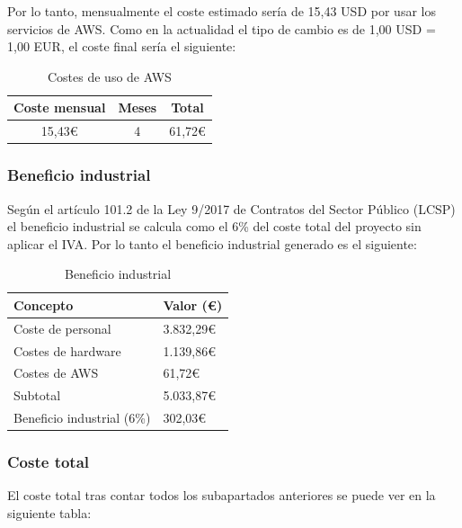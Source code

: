 Por lo tanto, mensualmente el coste estimado sería de 15,43 USD por usar los servicios de AWS. Como en la actualidad el tipo de cambio es de 1,00 USD = 1,00 EUR, el coste final sería el siguiente:

\begin{table}[H]
    \centering
    \begin{tabular}{cc|c}
    \hline
    \textbf{Coste mensual} & \textbf{Meses} & \textbf{Total} \\ \hline
    15,43€ & 4 & 61,72€ \\ \hline
    \end{tabular}
    \caption{Costes de uso de AWS}
    \label{tab:coste_aws}
\end{table}

\subsubsection{Beneficio industrial}

Según el artículo 101.2 de la Ley 9/2017 de Contratos del Sector Público (LCSP) el beneficio industrial se calcula como el 6\% del coste total del proyecto sin aplicar el IVA. Por lo tanto el beneficio industrial generado es el siguiente:

\begin{table}[H]
    \centering
    \begin{tabular}{ll}
    \hline
    \textbf{Concepto}           & \textbf{Valor (€)} \\ \hline
    Coste de personal           & 3.832,29€      \\
    Costes de hardware          & 1.139,86€ \\
    Costes de AWS               & 61,72€ \\ \hline
    Subtotal                    & 5.033,87€ \\ \hline
    Beneficio industrial (6\%)  & 302,03€ \\ \hline
    \end{tabular}
    \caption{Beneficio industrial}
    \label{tab:beneficio_industrial}
\end{table}

\subsubsection{Coste total}

El coste total tras contar todos los subapartados anteriores se puede ver en la siguiente tabla:

